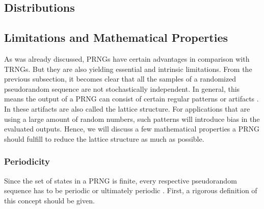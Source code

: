 \documentclass{stdlocal}
\begin{document}
  \subsection{Distributions}

  \subsection{Limitations and Mathematical Properties}
  As was already discussed, PRNGs have certain advantages in comparison with TRNGs.
  But they are also yielding essential and intrinsic limitations.
  From the previous subsection, it becomes clear that all the samples of a randomized pseudorandom sequence are not stochastically independent.
  In general, this means the output of a PRNG can consist of certain regular patterns or artifacts \autocite{lecuyer1994,oneill2014}.
  In \textcite{lecuyer1994} these artifacts are also called the lattice structure.
  For applications that are using a large amount of random numbers, such patterns will introduce bias in the evaluated outputs.
  Hence, we will discuss a few mathematical properties a PRNG should fulfill to reduce the lattice structure as much as possible.

  \subsubsection*{Periodicity}
  Since the set of states in a PRNG is finite, every respective pseudorandom sequence has to be periodic or ultimately periodic \autocite{lecuyer1994,bauke2007}.
  First, a rigorous definition of this concept should be given.
\end{document}
